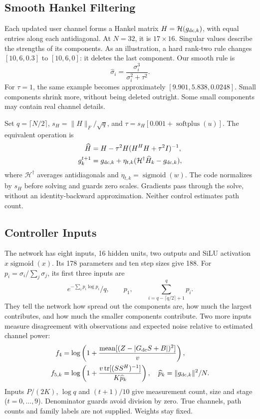 \documentclass[journal]{IEEEtran}
\newcommand{\Hank}{\mathcal{H}}
\DeclareMathOperator{\sigmoid}{sigmoid}
\DeclareMathOperator{\softplus}{softplus}
\DeclareMathOperator{\tr}{tr}
\begin{document}
\subsection{Smooth Hankel Filtering}
Each updated user channel forms a Hankel matrix $H=\Hank(g_{{\rm dc},k})$,
with equal entries along each antidiagonal. At $N=32$, it is $17\times16$.
Singular values describe the strengths of its components. As an
illustration, a hard rank-two rule changes $[10,6,0.3]$ to $[10,6,0]$:
it deletes the last component. Our smooth rule is
\begin{equation}
 \widehat\sigma_i=\frac{\sigma_i^3}{\sigma_i^2+\tau^2}.
\end{equation}
For $\tau=1$, the same example becomes approximately
$[9.901,5.838,0.0248]$. Small components shrink more, without being
deleted outright. Some small components may contain real channel details.

Set $q=\lceil N/2\rceil$, $s_H=\|H\|_F/\sqrt q$, and
$\tau=s_H[0.001+\softplus(u)]$. The equivalent operation is
\begin{align}
 \widehat H&=H-\tau^2H(H^HH+\tau^2I)^{-1},\\
 g_k^{t+1}&=g_{{\rm dc},k}+\eta_{t,k}
 (\Hank^\dagger\widehat H_k-g_{{\rm dc},k}),
\end{align}
where $\Hank^\dagger$ averages antidiagonals and
$\eta_{t,k}=\sigmoid(w)$. The code normalizes by $s_H$ before solving and
guards zero scales. Gradients pass through the solve, without an
identity-backward approximation. Neither control estimates path count.

\subsection{Controller Inputs}
The network has eight inputs, 16 hidden units, two outputs and SiLU
activation $x\sigmoid(x)$. Its 178 parameters and ten step sizes give 188. For
$p_i=\sigma_i/\sum_j\sigma_j$, its first
three inputs are
\begin{equation}
 e^{-\sum_i p_i\log p_i}/q,\qquad p_1,\qquad
 \sum_{i=q-\lceil q/2\rceil+1}^{q}p_i.
\end{equation}
They tell the network how spread out the components are, how much the
largest contributes, and how much the smaller components contribute.
Two more inputs measure disagreement with observations and expected
noise relative to estimated channel power:
\begin{align}
 f_4&=\log\left(1+\frac{\operatorname{mean}[(Z-|G_{\rm dc}S+B|)^2]}{v}\right),\\
 f_{5,k}&=\log\left(1+\frac{v\tr[(SS^H)^{-1}]}{K\widehat p_k}\right),
 \quad\widehat p_k=\|g_{{\rm dc},k}\|^2/N.
\end{align}
Inputs $P/(2K)$, $\log q$ and $(t+1)/10$ give measurement count, size and
stage ($t=0,\ldots,9$). Denominator guards avoid division by zero.
True channels, path counts and family labels are not supplied. Weights stay fixed.
\end{document}
